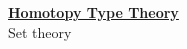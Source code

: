 \documentclass[hott-all.tex]{subfiles}
\begin{document}
\begin{center}
  {\Large{\underline{\textbf{Homotopy Type Theory}}}} \\[2mm]
  {\large Set theory}
\end{center}

\setcounter{chapter}{10}

% 
% 
% 
% 
% 
% 
\end{document}
